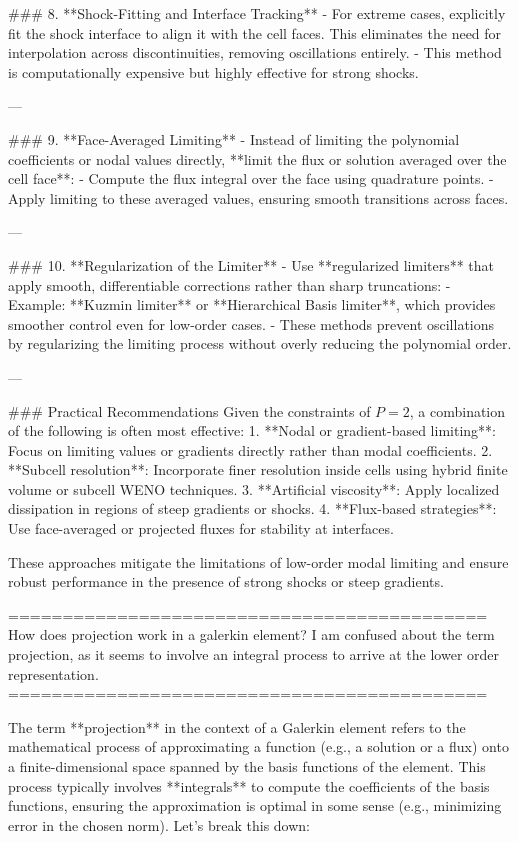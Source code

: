 ### 8. **Shock-Fitting and Interface Tracking**
   - For extreme cases, explicitly fit the shock interface to align it with the cell faces. This eliminates the need for interpolation across discontinuities, removing oscillations entirely.
   - This method is computationally expensive but highly effective for strong shocks.

---

### 9. **Face-Averaged Limiting**
   - Instead of limiting the polynomial coefficients or nodal values directly, **limit the flux or solution averaged over the cell face**:
     - Compute the flux integral over the face using quadrature points.
     - Apply limiting to these averaged values, ensuring smooth transitions across faces.

---

### 10. **Regularization of the Limiter**
   - Use **regularized limiters** that apply smooth, differentiable corrections rather than sharp truncations:
     - Example: **Kuzmin limiter** or **Hierarchical Basis limiter**, which provides smoother control even for low-order cases.
     - These methods prevent oscillations by regularizing the limiting process without overly reducing the polynomial order.

---

### Practical Recommendations
Given the constraints of \( P = 2 \), a combination of the following is often most effective:
1. **Nodal or gradient-based limiting**: Focus on limiting values or gradients directly rather than modal coefficients.
2. **Subcell resolution**: Incorporate finer resolution inside cells using hybrid finite volume or subcell WENO techniques.
3. **Artificial viscosity**: Apply localized dissipation in regions of steep gradients or shocks.
4. **Flux-based strategies**: Use face-averaged or projected fluxes for stability at interfaces.

These approaches mitigate the limitations of low-order modal limiting and ensure robust performance in the presence of strong shocks or steep gradients.

============================================
How does projection work in a galerkin element? I am confused about the term projection, as it seems to involve an integral process to arrive at the lower order representation.
============================================

The term **projection** in the context of a Galerkin element refers to the mathematical process of approximating a function (e.g., a solution or a flux) onto a finite-dimensional space spanned by the basis functions of the element. This process typically involves **integrals** to compute the coefficients of the basis functions, ensuring the approximation is optimal in some sense (e.g., minimizing error in the chosen norm). Let’s break this down:

